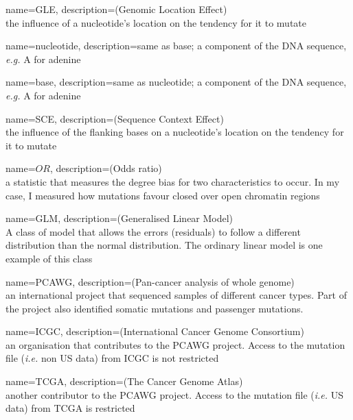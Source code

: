 \makeglossaries
{}
{
        name=GLE,
        description={(Genomic Location Effect) \\ the influence of a nucleotide's location on the tendency for it to mutate}
}

{
        name=nucleotide,
        description={same as base; a component of the DNA sequence, \textit{e.g.} A for adenine}
}

{
        name=base,
        description={same as nucleotide; a component of the DNA sequence, \textit{e.g.} A for adenine}
}

{
        name=SCE,
        description={(Sequence Context Effect) \\ the influence of the flanking bases on a nucleotide's location on the tendency for it to mutate}
}

{
        name=$OR$,
        description={(Odds ratio) \\ a statistic that measures the degree bias for two characteristics to occur. In my case, I measured how mutations favour closed over open chromatin regions}
}

{
        name=GLM,
        description={(Generalised Linear Model) \\ A class of model that allows the errors (residuals) to follow a different distribution than the normal distribution. The ordinary linear model is one example of this class}
}

{
        name=PCAWG,
        description={(Pan-cancer analysis of whole genome) \\ an international project that sequenced samples of different cancer types. Part of the project also identified somatic mutations and passenger mutations.}
}

{
        name=ICGC,
        description={(International Cancer Genome Consortium) \\ an organisation that contributes to the PCAWG project. Access to the mutation file (\textit{i.e.} non US data) from ICGC is not restricted}
}

{
        name=TCGA,
        description={(The Cancer Genome Atlas) \\ another contributor to the PCAWG project. Access to the mutation file (\textit{i.e.} US data) from TCGA is restricted}
}

